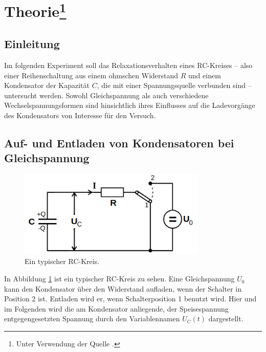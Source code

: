 \section{Theorie\footnote{Unter Verwendung der Quelle \cite{Versuchsanleitung}.}}
\label{sec:Theorie}

\subsection{Einleitung}

Im folgenden Experiment soll das Relaxationsverhalten eines RC-Kreises -- also einer Reihenschaltung aus einem ohmschen 
Widerstand $R$ und einem Kondensator der Kapazität $C$, die mit einer Spannungsquelle verbunden sind -- untersucht werden. 
Sowohl Gleichspannung als auch verschiedene Wechselspannungsformen sind hinsichtlich ihres Einflusses auf die Ladevorgänge 
des Kondensators von Interesse für den Versuch.

\subsection{Auf- und Entladen von Kondensatoren bei Gleichspannung}
\label{sub:AufUndAb}

\begin{figure}
    \centering
    \includegraphics[width=0.8\textwidth]{plots/Schaltung1.png}
    \caption{Ein typischer RC-Kreis.}
    \label{fig:stinknormal_RC}
\end{figure}

In Abbildung \ref{fig:stinknormal_RC} ist ein typischer RC-Kreis zu sehen. 
Eine Gleichspannung $U_0$ kann den Kondensator über den Widerstand aufladen, wenn der Schalter in Position 2 ist. 
Entladen wird er, wenn Schalterposition 1 benutzt wird. 
Hier und im Folgenden wird die am Kondensator anliegende, der Speisespannung entgegengesetzten Spannung durch den  
Variablennamen $U_C(t)$ dargestellt. 

